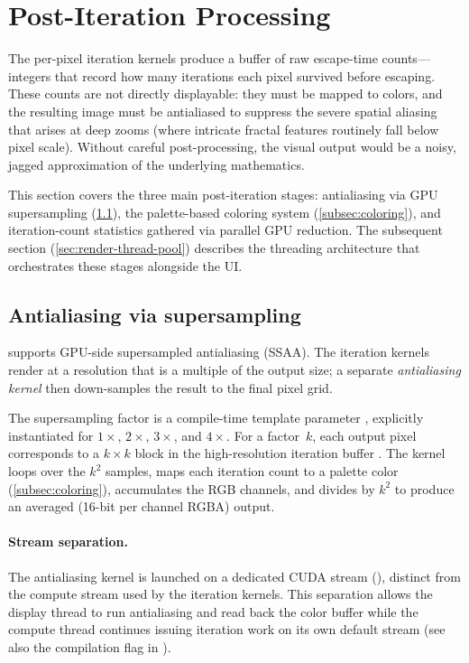 \section{Post-Iteration Processing}
\label{sec:misc-details}

The per-pixel iteration kernels produce a buffer of raw escape-time
counts---integers that record how many iterations each pixel survived
before escaping.  These counts are not directly displayable: they must
be mapped to colors, and the resulting image must be antialiased to
suppress the severe spatial aliasing that arises at deep zooms (where
intricate fractal features routinely fall below pixel scale).  Without
careful post-processing, the visual output would be a noisy, jagged
approximation of the underlying mathematics.

This section covers the three main post-iteration stages:
antialiasing via GPU supersampling (\cref{subsec:antialiasing}), the
palette-based coloring system (\cref{subsec:coloring}), and
iteration-count statistics gathered via parallel GPU reduction.  The
subsequent section (\cref{sec:render-thread-pool}) describes the
threading architecture that orchestrates these stages alongside the UI.

\subsection{Antialiasing via supersampling}
\label{subsec:antialiasing}

\FractalShark{} supports GPU-side supersampled antialiasing (SSAA).
The iteration kernels render at a resolution that is a multiple of
the output size; a separate \emph{antialiasing kernel} then
down-samples the result to the final pixel grid.

The supersampling factor is a compile-time template parameter
, explicitly instantiated for $1\times$, $2\times$,
$3\times$, and $4\times$.  For a factor~$k$, each output pixel
corresponds to a $k\times k$ block in the high-resolution iteration
buffer .  The kernel loops over the $k^2$
samples, maps each iteration count to a palette color
(\cref{subsec:coloring}), accumulates the RGB channels, and divides
by $k^2$ to produce an averaged  (16-bit per channel
RGBA) output.

\paragraph{Stream separation.}
The antialiasing kernel is launched on a dedicated CUDA stream
(), distinct from the compute stream used by the
iteration kernels.  This separation allows the display thread to run
antialiasing and read back the color buffer while the compute thread
continues issuing iteration work on its own default stream
(see also the 
compilation flag in ).

